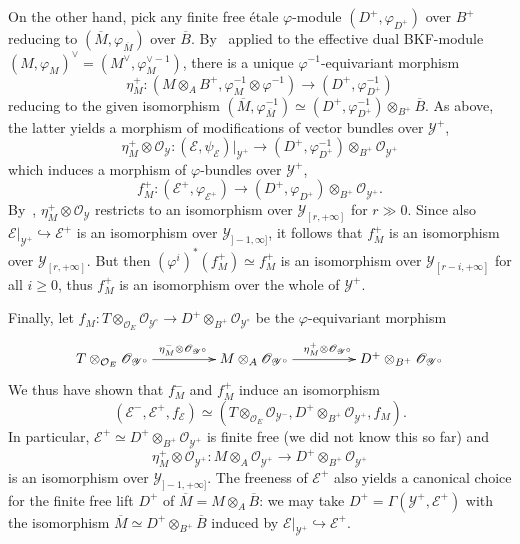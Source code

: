\documentclass[11pt]{article}
\theoremstyle{definition}
\numberwithin{equation}{section}
\numberwithin{figure}{section}
\numberwithin{table}{section}
\begin{document}
On the other hand, pick any finite free \'etale $\varphi$-module $(D^{+},\varphi_{D^{+}})$ over $B^{+}$ reducing to $(\overline{M},\varphi_{\overline{M}})$ over $\overline{B}$. By~\cite[4.26]{Fa15} applied to the effective dual BKF-module $(M,\varphi_{M})^{\vee}=(M^{\vee},\varphi_{M}^{\vee-1})$, there is a unique $\varphi^{-1}$-equivariant morphism
\[
\eta_{M}^{+}:\left(M\otimes_{A}B^{+},\varphi_{M}^{-1}\otimes\varphi^{-1}\right)\rightarrow\left(D^{+},\varphi_{D^{+}}^{-1}\right)
\]
reducing to the given isomorphism $(\overline{M},\varphi_{\overline{M}}^{-1})\simeq\left(D^{+},\varphi_{D^{+}}^{-1}\right)\otimes_{B^{+}}\overline{B}$. As above, the latter yields a morphism of modifications of vector bundles over $\mathscr{Y}^{+}$,
\[
\eta_{M}^{+}\otimes\mathscr{O}_{\mathscr{Y}}:\left(\mathscr{E},\psi_{\mathscr{E}}\right)\vert_{\mathscr{Y}^{+}}\rightarrow\left(D^{+},\varphi_{D^{+}}^{-1}\right)\otimes_{B^{+}}\mathscr{O}_{\mathscr{Y}^{+}}
\]
which induces a morphism of $\varphi$-bundles over $\mathscr{Y}^{+}$,
\[
f_{M}^{+}:\left(\mathscr{E}^{+},\varphi_{\mathscr{E}^{+}}\right)\rightarrow\left(D^{+},\varphi_{D^{+}}\right)\otimes_{B^{+}}\mathscr{O}_{\mathscr{Y}^{+}}.
\]
By~\cite[4.31]{Fa15}, $\eta_{M}^{+}\otimes\mathscr{O}_{\mathscr{Y}}$ restricts to an isomorphism over $\mathscr{Y}_{[r,+\infty]}$ for $r\gg0$. Since also $\mathscr{E}\vert_{\mathscr{Y}^{+}}\hookrightarrow\mathscr{E}^{+}$ is an isomorphism over $\mathscr{Y}_{]-1,\infty]}$, it follows that $f_{M}^{+}$ is an isomorphism over $\mathscr{Y}_{[r,+\infty]}$. But then $(\varphi^{i})^{\ast}(f_{M}^{+})\simeq f_{M}^{+}$ is an isomorphism over $\mathscr{Y}_{[r-i,+\infty]}$ for all $i\geq0$, thus $f_{M}^{+}$ is an isomorphism over the whole of $\mathscr{Y}^{+}$.

Finally, let $f_{M}:T\otimes_{\mathcal{O}_{E}}\mathscr{O}_{\mathscr{Y}^{\circ}}\rightarrow D^{+}\otimes_{B^{+}}\mathscr{O}_{\mathscr{Y}^{\circ}}$ be the $\varphi$-equivariant morphism
\[
\xymatrix@C=45pt{T\otimes_{\mathcal{O}_{E}}\mathscr{O}_{\mathscr{Y}^{\circ}}\ar[r]^{\eta_{M}^{-}\otimes\mathscr{O}_{\mathscr{Y}^{\circ}}} & M\otimes_{A}\mathscr{O}_{\mathscr{Y}^{\circ}}\ar[r]^{\eta_{M}^{+}\otimes\mathscr{O}_{\mathscr{Y}^{\circ}}} & D^{+}\otimes_{B^{+}}\mathscr{O}_{\mathscr{Y}^{\circ}}}
\]
We thus have shown that $f_{M}^{-}$ and $f_{M}^{+}$ induce an isomorphism
\[
\left(\mathscr{E}^{-},\mathscr{E}^{+},f_{\mathscr{E}}\right)\simeq\left(T\otimes_{\mathcal{O}_{E}}\mathscr{O}_{\mathscr{Y}^{-}},D^{+}\otimes_{B^{+}}\mathscr{O}_{\mathscr{Y}^{+}},f_{M}\right).
\]
In particular, $\mathscr{E}^{+}\simeq D^{+}\otimes_{B^{+}}\mathscr{O}_{\mathscr{Y}^{+}}$ is finite free (we did not know this so far) and
\[
\eta_{M}^{+}\otimes\mathscr{O}_{\mathscr{Y}^{+}}:M\otimes_{A}\mathscr{O}_{\mathscr{Y}^{+}}\rightarrow D^{+}\otimes_{B^{+}}\mathscr{O}_{\mathscr{Y}^{+}}
\]
is an isomorphism over $\mathscr{Y}_{]-1,+\infty]}$. The freeness of $\mathscr{E}^{+}$ also yields a canonical choice for the finite free lift $D^{+}$ of $\overline{M}=M\otimes_{A}\overline{B}$: we may take $D^{+}=\Gamma(\mathscr{Y}^{+},\mathscr{E}^{+})$ with the isomorphism $\overline{M}\simeq D^{+}\otimes_{B^{+}}\overline{B}$ induced by $\mathscr{E}\vert_{\mathscr{Y}^{+}}\hookrightarrow\mathscr{E}^{+}$.
\end{document}
